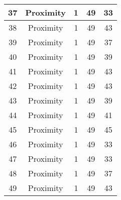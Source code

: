 \documentclass[results.tex]{subfiles}
\begin{document}
\begin{center}
\begin{tabular}{| c || c | c | c | c |}
            \hline
            37                      & Proximity                    & 1                      & 49                      & 33                   \\
            \hline
            38                      & Proximity                    & 1                      & 49                      & 43                   \\
            \hline
            39                      & Proximity                    & 1                      & 49                      & 37                   \\
            \hline
            40                      & Proximity                    & 1                      & 49                      & 39                   \\
            \hline
            41                      & Proximity                    & 1                      & 49                      & 43                   \\
            \hline
            42                      & Proximity                    & 1                      & 49                      & 43                   \\
            \hline
            43                      & Proximity                    & 1                      & 49                      & 39                   \\
            \hline
            44                      & Proximity                    & 1                      & 49                      & 41                   \\
            \hline
            45                      & Proximity                    & 1                      & 49                      & 45                   \\
            \hline
            46                      & Proximity                    & 1                      & 49                      & 33                   \\
            \hline
            47                      & Proximity                    & 1                      & 49                      & 33                   \\
            \hline
            48                      & Proximity                    & 1                      & 49                      & 37                   \\
            \hline
            49                      & Proximity                    & 1                      & 49                      & 43                   \\
            \hline
        \end{tabular}
    \end{center}
\end{document}
